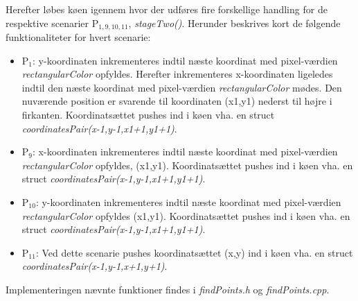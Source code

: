 Herefter løbes køen igennem hvor der udføres fire forskellige handling for de respektive scenarier P\(_{1, 9, 10, 11}\), \emph{stageTwo()}. Herunder beskrives kort de følgende funktionaliteter for hvert scenarie:

\begin{itemize}

\item P\(_{1}\): y-koordinaten inkrementeres indtil næste koordinat med pixel-værdien \emph{rectangularColor} opfyldes. Herefter inkrementeres x-koordinaten ligeledes indtil den næste koordinat med pixel-værdien \emph{rectangularColor} mødes. Den nuværende position er svarende til koordinaten (x1,y1) nederst til højre i firkanten. Koordinatsættet pushes ind i køen vha. en struct \emph{coordinatesPair(x-1,y-1,x1+1,y1+1)}.
\item P\(_{9}\): x-koordinaten inkrementeres indtil næste koordinat med pixel-værdien \emph{rectangularColor} opfyldes, (x1,y1). 
Koordinatsættet pushes ind i køen vha. en struct \emph{coordinatesPair(x-1,y-1,x1+1,y1+1)}.
\item P\(_{10}\): y-koordinaten inkrementeres indtil næste koordinat med pixel-værdien \emph{rectangularColor} opfyldes (x1,y1). Koordinatsættet pushes ind i køen vha. en struct \emph{coordinatesPair(x-1,y-1,x1+1,y1+1)}.
\item P\(_{11}\): Ved dette scenarie pushes koordinatsættet (x,y) ind i køen vha. en struct \emph{coordinatesPair(x-1,y-1,x+1,y+1)}.
\end{itemize}
Implementeringen nævnte funktioner findes i \emph{findPoints.h} og \emph{findPoints.cpp}.





